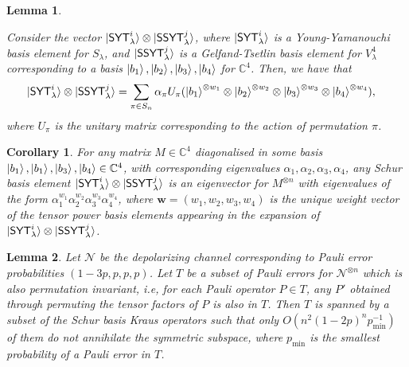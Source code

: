 \documentclass[10pt,a4paper]{amsart}
\newtheorem{lemma}{Lemma}
\newtheorem{corollary}{Corollary}
\begin{document}
\begin{lemma}\label{lem:wtvector}
    
    Consider the vector  $\ket{\mathsf{SYT}^i_\lambda} \otimes \ket{\mathsf{SSYT}^j_\lambda}$, where $\ket{\mathsf{SYT}^i_\lambda}$ is a Young-Yamanouchi basis element for $S_\lambda$, and $\ket{\mathsf{SSYT}^j_\lambda}$ is a Gelfand-Tsetlin basis element for $V^4_\lambda$ corresponding to a basis $\ket{b_1},\ket{b_2},\ket{b_3},\ket{b_4}$ for $\mathbb C^4$. Then, we have that
    \begin{align*}
        \ket{\mathsf{SYT}^i_\lambda} \otimes \ket{\mathsf{SSYT}^j_\lambda} &= \sum_{\pi \in S_n} \alpha_{\pi} U_{\pi}(\ket{b_1}^{\otimes w_1} \otimes \ket{b_2}^{\otimes w_2} \otimes \ket{b_3}^{\otimes w_3} \otimes \ket{b_4}^{\otimes w_4}),
    \end{align*}
where $U_{\pi}$ is the unitary matrix corresponding to the action of permutation $\pi$. 
\end{lemma}

\begin{corollary}\label{cor:probwtvector}
    For any matrix $M\in \mathbb C^4$ diagonalised in some basis $\ket{b_1},\ket{b_1},\ket{b_3},\ket{b_4}\in\mathbb C^4$, with corresponding eigenvalues $\alpha_1,\alpha_2, \alpha_3, \alpha_4$, any Schur basis element $\ket{\mathsf{SYT}^i_\lambda} \otimes \ket{\mathsf{SSYT}^j_\lambda}$ is an eigenvector for $M^{\otimes n}$ with eigenvalues of the form $\alpha_1^{w_1}\alpha_2^{w_2}\alpha_3^{w_3}\alpha_4^{w_4}$, where $\mathbf w=(w_1,w_2,w_3,w_4)$ is the unique weight vector of the tensor power basis elements appearing in the expansion of $\ket{\mathsf{SYT}^i_\lambda} \otimes \ket{\mathsf{SSYT}^j_\lambda}$.
\end{corollary}

\begin{lemma}\label{lem:rank}
Let $\mathcal N$ be the depolarizing channel corresponding to Pauli error probabilities $(1-3p,p,p,p)$. Let $T$ be a subset of Pauli errors for $\mathcal N^{\otimes n}$ which is also permutation invariant, i.e, for each Pauli operator $P \in T$, any $P'$ obtained through permuting the tensor factors of $P$ is also in $T$. Then $T$ is spanned by a subset of the Schur basis Kraus operators such that only $O(n^2(1-2p)^n p_{\min}^{-1})$ of them do not annihilate the symmetric subspace, where $p_{\min}$ is the smallest probability of a Pauli error in $T$.
\end{lemma}
\end{document}
